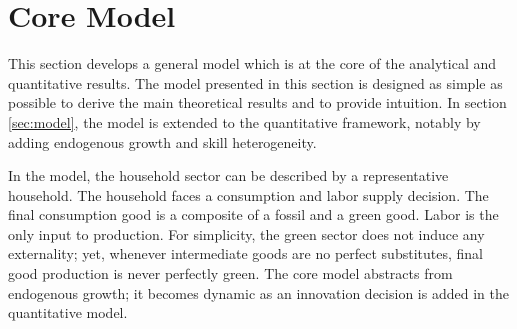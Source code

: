 \section{Core Model}\label{sec:mod_an}

This section develops a general model which is at the core of the analytical and quantitative results. 
The model presented in this section is designed as simple as possible to derive  the main theoretical results and to provide intuition. In section \ref{sec:model}, the model is extended to the quantitative framework, notably by adding endogenous growth and skill heterogeneity. %

In the model, the household sector can be described by a representative household. The household faces a consumption and labor supply decision. The final consumption good is a composite of a fossil and a green good. Labor is the only input to production. For simplicity, the green sector does not induce any externality; yet, whenever intermediate goods are no perfect substitutes, final good production is never perfectly green. The core model abstracts from endogenous growth; it becomes dynamic as an innovation decision is added in the quantitative model.

